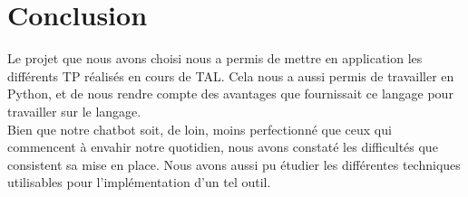 \documentclass[paper=a4]{article}
\begin{document}

\section*{Conclusion}

Le projet que nous avons choisi nous a permis de mettre en application
les différents TP réalisés en cours de TAL. Cela nous a aussi permis de
travailler en Python, et de nous rendre compte des avantages que
fournissait ce langage pour travailler sur le langage. \\

Bien que notre chatbot soit, de loin, moins perfectionné que ceux qui
commencent à envahir notre quotidien, nous avons constaté les
difficultés que consistent sa mise en place. Nous avons aussi pu étudier
les différentes techniques utilisables pour l'implémentation d'un tel
outil.
\end{document}

